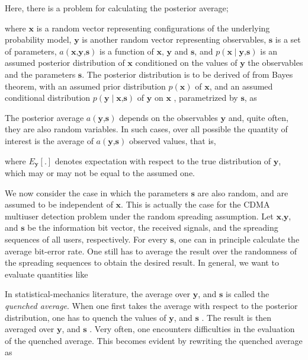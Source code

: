 \documentclass[letterpaper,english,10pt]{article}
\begin{document}
Here, there is a problem for calculating the posterior average;

where $\textbf{x}$ is a random vector representing configurations of the underlying probability model, $\textbf{y}$ is another random vector representing observables, $\textbf{s}$ is a set of parameters, $a(\textbf{x,y,s})$ is a function of $\textbf{x, y}$ and $\textbf{s}$, and $p(\textbf{x}\mid\textbf{y,s})$ is an assumed posterior distribution of $\textbf{x}$ conditioned on the values of $\textbf{y}$ the observables and the parameters $\textbf{s}$. The posterior distribution is to be derived of from Bayes theorem, with an assumed prior distribution $p(\textbf{x})$ of $\textbf{x}$, and an assumed conditional distribution $p(\textbf{y} \mid \textbf{x,s})$ of $\textbf{y}$ on $\textbf{x}$ , parametrized by $\textbf{s}$, as

The posterior average $a(\textbf{y,s})$ depends on the observables $\textbf{y}$ and, quite often, they are also random variables. In such cases, over all possible the quantity of interest is the average of $a(\textbf{y,s})$ observed values, that is,

where $E_{\textbf{y}}[.]$ denotes expectation with respect to the true distribution of $\textbf{y}$, which may or may not be equal to the assumed one.

We now consider the case in which the parameters $\textbf{s}$ are also random, and are assumed to be independent of $\textbf{x}$. This is actually the case for the CDMA multiuser detection problem under the
random spreading assumption. Let  $\textbf{x,y}$, and $\textbf{s}$ be the information bit vector, the received signals, and the spreading sequences of all users, respectively. For every $\textbf{s}$, one can in principle calculate the average bit-error rate. One still has to average the result over the randomness of the spreading sequences to obtain the desired result. In general, we want to evaluate quantities like

In statistical-mechanics literature, the average over $\textbf{y}$, and $\textbf{s}$ is called the \textit{quenched average}. When one first takes the average with respect to the posterior distribution, one has to quench the values of $\textbf{y}$, and $\textbf{s}$ . The result is then averaged over $\textbf{y}$, and $\textbf{s}$ . Very often, one encounters difficulties in the evaluation of the quenched average. This becomes evident by rewriting the quenched average as
\end{document}
